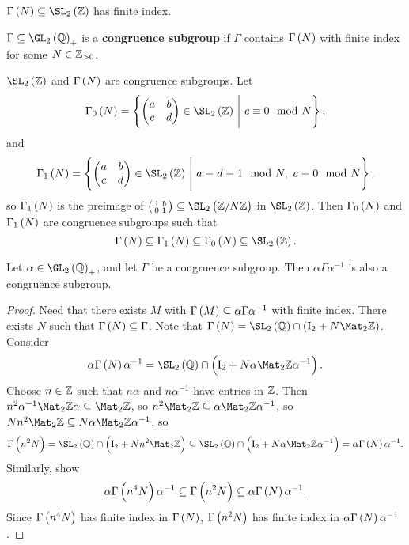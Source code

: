\begin{note*}
$ \Gamma\br{N} \subseteq \SL_2\br{\ZZ} $ has finite index.
\end{note*}

\begin{definition}
$ \Gamma \subseteq \GL_2\br{\QQ}_+ $ is a \textbf{congruence subgroup} if $ \Gamma $ contains $ \Gamma\br{N} $ with finite index for some $ N \in \mathbb{Z}_{> 0} $.
\end{definition}

\begin{example*}
$ \SL_2\br{\ZZ} $ and $ \Gamma\br{N} $ are congruence subgroups. Let
$$ \Gamma_0\br{N} = \cbr{\twobytwo{a}{b}{c}{d} \in \SL_2\br{\ZZ} \st c \equiv 0 \mod N}, $$
and
$$ \Gamma_1\br{N} = \cbr{\twobytwo{a}{b}{c}{d} \in \SL_2\br{\ZZ} \st a \equiv d \equiv 1 \mod N, \ c \equiv 0 \mod N}, $$
so $ \Gamma_1\br{N} $ is the preimage of $ \twobytwosmall{1}{b}{0}{1} \subseteq \SL_2\br{\ZZ / N\ZZ} $ in $ \SL_2\br{\ZZ} $. Then $ \Gamma_0\br{N} $ and $ \Gamma_1\br{N} $ are congruence subgroups such that
$$ \Gamma\br{N} \subseteq \Gamma_1\br{N} \subseteq \Gamma_0\br{N} \subseteq \SL_2\br{\ZZ}. $$
\end{example*}

\begin{proposition}
Let $ \alpha \in \GL_2\br{\QQ}_+ $, and let $ \Gamma $ be a congruence subgroup. Then $ \alpha\Gamma\alpha^{-1} $ is also a congruence subgroup.
\end{proposition}

\begin{proof}
Need that there exists $ M $ with $ \Gamma\br{M} \subseteq \alpha\Gamma\alpha^{-1} $ with finite index. There exists $ N $ such that $ \Gamma\br{N} \subseteq \Gamma $. Note that $ \Gamma\br{N} = \SL_2\br{\QQ} \cap \br{\I_2 + N\Mat_2 \ZZ} $. Consider
$$ \alpha\Gamma\br{N}\alpha^{-1} = \SL_2\br{\QQ} \cap \br{\I_2 + N\alpha\Mat_2 \ZZ\alpha^{-1}}. $$
Choose $ n \in \mathbb{Z} $ such that $ n\alpha $ and $ n\alpha^{-1} $ have entries in $ \mathbb{Z} $. Then $ n^2\alpha^{-1}\Mat_2 \ZZ\alpha \subseteq \Mat_2 \ZZ $, so $ n^2\Mat_2 \ZZ \subseteq \alpha\Mat_2 \ZZ\alpha^{-1} $, so $ Nn^2\Mat_2 \ZZ \subseteq N\alpha\Mat_2 \ZZ\alpha^{-1} $, so
$$ \Gamma\br{n^2N} = \SL_2\br{\QQ} \cap \br{\I_2 + Nn^2\Mat_2 \ZZ} \subseteq \SL_2\br{\QQ} \cap \br{\I_2 + N\alpha\Mat_2 \ZZ\alpha^{-1}} = \alpha\Gamma\br{N}\alpha^{-1}. $$
Similarly, show
$$ \alpha\Gamma\br{n^4N}\alpha^{-1} \subseteq \Gamma\br{n^2N} \subseteq \alpha\Gamma\br{N}\alpha^{-1}. $$
Since $ \Gamma\br{n^4N} $ has finite index in $ \Gamma\br{N} $, $ \Gamma\br{n^2N} $ has finite index in $ \alpha\Gamma\br{N}\alpha^{-1} $.
\end{proof}

